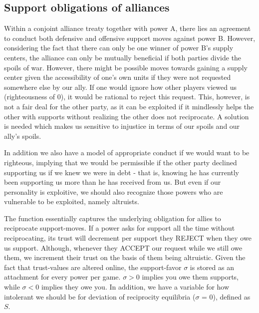 \documentclass[a4paper]{article} %
\begin{document}
\subsection{Support obligations of alliances}

Within a conjoint alliance treaty together with power A, there lies an agreement to conduct both defensive and offensive support moves against power B. However, considering the fact that there can only be one winner of power B’s supply centers, the alliance can only be mutually beneficial if both parties divide the spoils of war. However, there might be possible moves towards gaining a supply center given the accessibility of one's own units if they were not requested somewhere else by our ally. If one would ignore how other players viewed us (righteousness of 0), it would be rational to reject this request. This, however, is not a fair deal for the other party, as it can be exploited if it mindlessly helps the other with supports without realizing the other does not reciprocate. A solution is needed which makes us sensitive to injustice in terms of our spoils and our ally's spoils.

 In addition we also have a model of appropriate conduct if we would want to be righteous, implying that we would be permissible if the other party declined supporting us if we knew we were in debt - that is, knowing he has currently been supporting us more than he has received from us. But even if our personality is exploitive, we should also recognize those powers who are vulnerable to be exploited, namely altruists.

The function essentially captures the underlying obligation for allies to reciprocate support-moves. If a power asks for support all the time without reciprocating, its trust will decrement per support they REJECT when they owe us support. Although, whenever they  ACCEPT our request while we still owe them, we increment their trust on the basis of them being altruistic. Given the fact that trust-values are altered online, the support-favor $\sigma$ is stored as an attachment for every power per game. $\sigma > 0 $ implies you owe them supports, while $\sigma < 0$ implies they owe you. In addition, we have a variable for how intolerant we should be for deviation of reciprocity equilibria ($\sigma$ = 0), defined as $S$.\\
\end{document}
